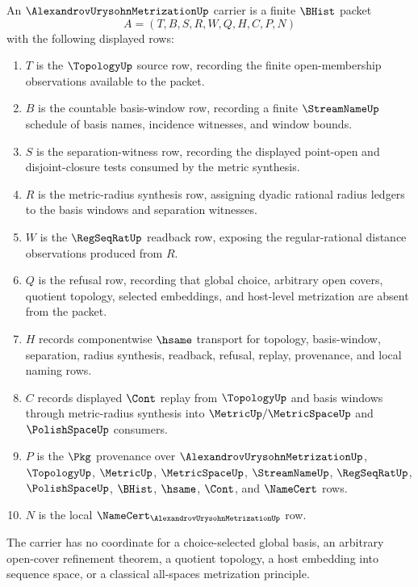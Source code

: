 \begin{definition}
\label{def:alexandrov-urysohn-metrization-carrier}
An $\AlexandrovUrysohnMetrizationUp$ carrier is a finite $\BHist$ packet
$$
A=(T,B,S,R,W,Q,H,C,P,N)
$$
with the following displayed rows:
\begin{enumerate}
\item $T$ is the $\TopologyUp$ source row, recording the finite open-membership observations available to the packet.
\item $B$ is the countable basis-window row, recording a finite $\StreamNameUp$ schedule of basis names, incidence witnesses, and window bounds.
\item $S$ is the separation-witness row, recording the displayed point-open and disjoint-closure tests consumed by the metric synthesis.
\item $R$ is the metric-radius synthesis row, assigning dyadic rational radius ledgers to the basis windows and separation witnesses.
\item $W$ is the $\RegSeqRatUp$ readback row, exposing the regular-rational distance observations produced from $R$.
\item $Q$ is the refusal row, recording that global choice, arbitrary open covers, quotient topology, selected embeddings, and host-level metrization are absent from the packet.
\item $H$ records componentwise $\hsame$ transport for topology, basis-window, separation, radius synthesis, readback, refusal, replay, provenance, and local naming rows.
\item $C$ records displayed $\Cont$ replay from $\TopologyUp$ and basis windows through metric-radius synthesis into $\MetricUp/\MetricSpaceUp$ and $\PolishSpaceUp$ consumers.
\item $P$ is the $\Pkg$ provenance over $\AlexandrovUrysohnMetrizationUp$, $\TopologyUp$, $\MetricUp$, $\MetricSpaceUp$, $\StreamNameUp$, $\RegSeqRatUp$, $\PolishSpaceUp$, $\BHist$, $\hsame$, $\Cont$, and $\NameCert$ rows.
\item $N$ is the local $\NameCert_{\AlexandrovUrysohnMetrizationUp}$ row.
\end{enumerate}
The carrier has no coordinate for a choice-selected global basis, an arbitrary open-cover refinement theorem, a quotient topology, a host embedding into sequence space, or a classical all-spaces metrization principle.
\end{definition}

